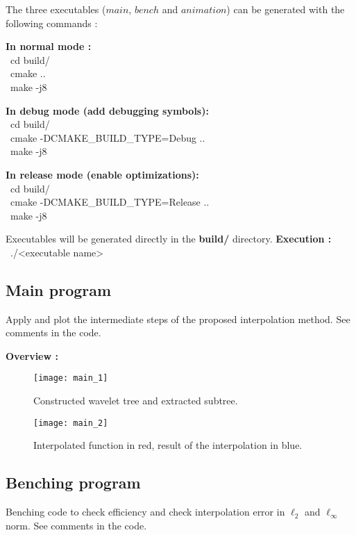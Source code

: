The three executables ($main$, $bench$ and $animation$) can be generated with the following commands :
\vskip 0.3cm

\noindent\textbf{In normal mode :} \\
\textrm{\tild\ cd build/} \\
\textrm{\tild\ cmake ..} \\
\textrm{\tild\ make -j8}

\vskip 0.3cm
\noindent\textbf{In debug mode (add debugging symbols):} \\
\textrm{\tild\ cd build/} \\
\textrm{\tild\ cmake -DCMAKE\_BUILD\_TYPE=Debug ..} \\
\textrm{\tild\ make -j8}

\clearpage
\noindent\textbf{In release mode (enable optimizations): } \\
\textrm{\tild\ cd build/} \\
\textrm{\tild\ cmake -DCMAKE\_BUILD\_TYPE=Release ..} \\
\textrm{\tild\ make -j8}

\vskip 0.3cm
\noindent Executables will be generated directly in the \textbf{build/} directory.
\vskip 0.3cm
\textbf{Execution :} \textrm{\tild\ ./<executable name>}
    
\subsection{Main program}
    Apply and plot the intermediate steps of the proposed interpolation method.
    See comments in the code.

    \vskip 0.3cm
    \textbf{Overview :}
    
    \begin{figure}[H]
    \centering
    \parbox{7cm}{
        \texttt{[image: main\_1]}
        \caption{Constructed wavelet tree and extracted subtree.}
    }
    \qquad
    \begin{minipage}{7cm}
        \texttt{[image: main\_2]}
        \caption{Interpolated function in red, result of the interpolation in blue.}
    \end{minipage}
\end{figure}


\subsection{Benching program}
    Benching code to check efficiency and check interpolation error in $\ell_2$ and $\ell_\infty$ norm.
    See comments in the code.

